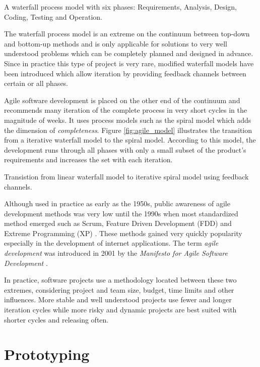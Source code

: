 {A waterfall process model with six phases: Requirements, Analysis, Design, Coding, Testing and Operation.}

The waterfall process model is an extreme on the continuum between top-down and bottom-up methods and is only applicable for solutions to very well understood problems which can be completely planned and designed in advance. Since in practice this type of project is very rare, modified waterfall models have been introduced which allow iteration by providing feedback channels between certain or all phases.

Agile software development is placed on the other end of the continuum and recommends many iteration of the complete process in very short cycles in the magnitude of weeks. It uses process models such as the spiral model which adds the dimension of \textit{completeness}. Figure \ref{fig:agile_model} illustrates the transition from a iterative waterfall model to the spiral model. According to this model, the development runs through all phases with only a small subset of the product's requirements and increases the set with each iteration.

{Transistion from linear waterfall model to iterative spiral model using feedback channels.}

Although used in practice as early as the 1950s, public awareness of agile development methods was very low until the 1990s when most standardized method emerged such as Scrum, Feature Driven Development (FDD) and Extreme Programming (XP) \cite{AgileHistory}. These methods gained very quickly popularity especially in the development of internet applications. The term \textit{agile development} was introduced in 2001 by the \textit{Manifesto for Agile Software Development} \cite{AgileManifesto}.

In practice, software projects use a methodology located between these two extremes, considering project and team size, budget, time limits and other influences. More stable and well understood projects use fewer and longer iteration cycles while more risky and dynamic projects are best suited with shorter cycles and releasing often.


\section{Prototyping}
\label{sec:prototyping}


